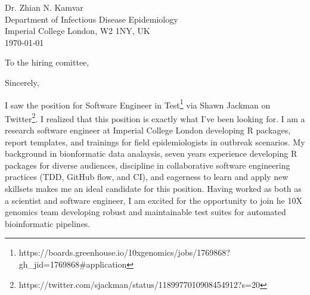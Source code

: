 


\clearpage
\begin{flushright}
  Dr. Zhian N. Kamvar\\
  Department of Infectious Disease Epidemiology\\
  Imperial College London, W2 1NY, UK\\
  \today
\end{flushright}

\date{\today} %
\opening{To the hiring comittee,}
\closing{Sincerely,} %


I saw the position for Software Engineer in
Test\footnote{https://boards.greenhouse.io/10xgenomics/jobs/1769868?gh_jid=1769868#application}
via Shawn Jackman on
Twitter\footnote{https://twitter.com/sjackman/status/1189977010908454912?s=20}.
I realized that this position is exactly what I've been looking for. I am a
research software engineer at Imperial College London developing R packages,
report templates, and trainings for field epidemiologists in outbreak
scenarios. My background in bionformatic data analaysis, seven years experience
developing R packages for diverse audiences, discipline in collaborative
software engineering practices (TDD, GitHub flow, and CI), and eagerness to
learn and apply new skillsets makes me an ideal candidate for this position.
Having worked as both as a scientist and software engineer, I am excited for
the opportunity to join he 10X genomics team developing robust and maintainable
test suites for automated bioinformatic pipelines.

\vspace{1ex}


